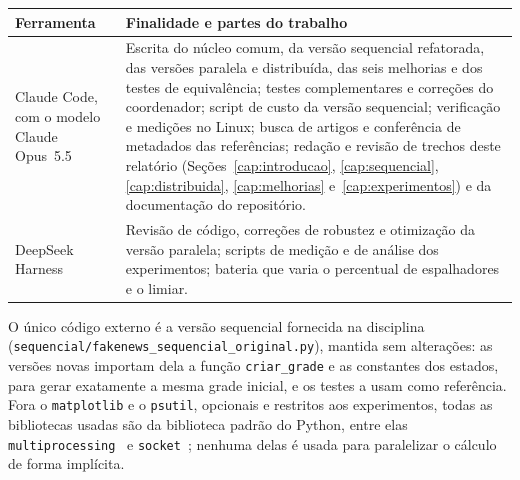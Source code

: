 \begin{tabframed}[!htb]
    \caption{Uso de inteligência artificial generativa no trabalho}
    \label{quad:uso-ia}
    \centering
    \footnotesize
    \begin{tabular}{|p{3.2cm}|p{11cm}|}
        \hline
        \textbf{Ferramenta} & \textbf{Finalidade e partes do trabalho} \\
        \hline
        Claude Code, com o modelo Claude Opus~5.5~\cite{AnthropicClaudeCode} & Escrita do núcleo comum, da versão sequencial refatorada, das versões paralela e distribuída, das seis melhorias e dos testes de equivalência; testes complementares e correções do coordenador; script de custo da versão sequencial; verificação e medições no Linux; busca de artigos e conferência de metadados das referências; redação e revisão de trechos deste relatório (Seções~\ref{cap:introducao}, \ref{cap:sequencial}, \ref{cap:distribuida}, \ref{cap:melhorias} e~\ref{cap:experimentos}) e da documentação do repositório. \\
        \hline
        DeepSeek Harness~\cite{DeepSeek} & Revisão de código, correções de robustez e otimização da versão paralela; scripts de medição e de análise dos experimentos; bateria que varia o percentual de espalhadores e o limiar. \\
        \hline
    \end{tabular}
    \fonte{}
\end{tabframed}

O único código externo é a versão sequencial fornecida na disciplina (\texttt{sequencial/fakenews\_sequencial\_original.py}), mantida sem alterações: as versões novas importam dela a função \texttt{criar\_grade} e as constantes dos estados, para gerar exatamente a mesma grade inicial, e os testes a usam como referência. Fora o \texttt{matplotlib} e o \texttt{psutil}, opcionais e restritos aos experimentos, todas as bibliotecas usadas são da biblioteca padrão do Python, entre elas \texttt{multiprocessing}~\cite{PythonMultiprocessing,PythonSharedMemory} e \texttt{socket}~\cite{PythonSocket}; nenhuma delas é usada para paralelizar o cálculo de forma implícita.
